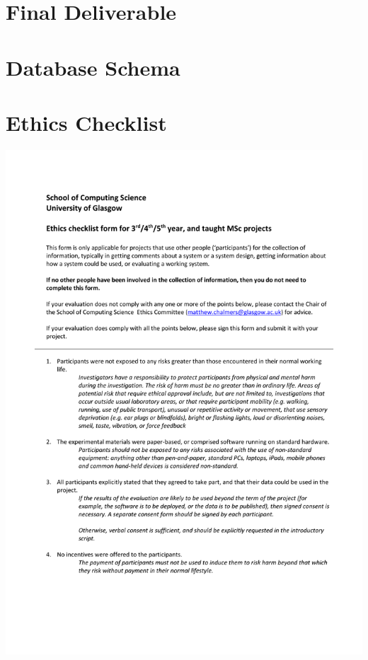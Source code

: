 \documentclass{l4proj}
\begin{document}
\begin{appendices}

\chapter{Final Deliverable}

\chapter{Database Schema}

\chapter{Ethics Checklist}
\centerline{
\includegraphics[width=1.2\textwidth, page=1]{dissertation/appendices/2549880G_ethics_checklist.pdf}
}






\end{appendices}
\end{document}
